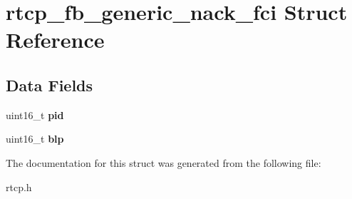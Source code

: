 \section{rtcp\+\_\+fb\+\_\+generic\+\_\+nack\+\_\+fci Struct Reference}
\label{structrtcp__fb__generic__nack__fci}
\subsection*{Data Fields}
\begin{DoxyCompactItemize}
\item 
\mbox{\label{structrtcp__fb__generic__nack__fci_a460492975ed2bda752d73b517bc86213}} 
uint16\+\_\+t {\bfseries pid}
\item 
\mbox{\label{structrtcp__fb__generic__nack__fci_ade99d29ebfb17531870ef480ea0801d8}} 
uint16\+\_\+t {\bfseries blp}
\end{DoxyCompactItemize}


The documentation for this struct was generated from the following file\+:\begin{DoxyCompactItemize}
\item 
rtcp.\+h\end{DoxyCompactItemize}
